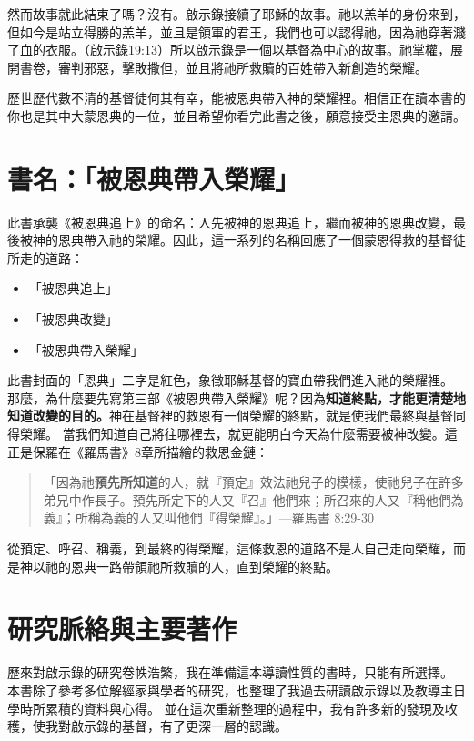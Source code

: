 然而故事就此結束了嗎？沒有。啟示錄接續了耶穌的故事。祂以羔羊的身份來到，但如今是站立得勝的羔羊，並且是領軍的君王，我們也可以認得祂，因為祂穿著濺了血的衣服。（啟示錄19:13）所以啟示錄是一個以基督為中心的故事。祂掌權，展開書卷，審判邪惡，擊敗撒但，並且將祂所救贖的百姓帶入新創造的榮耀。

歷世歷代數不清的基督徒何其有幸，能被恩典帶入神的榮耀裡。相信正在讀本書的你也是其中大蒙恩典的一位，並且希望你看完此書之後，願意接受主恩典的邀請。

\section*{書名：「被恩典帶入榮耀」}

此書承襲《被恩典追上》的命名：人先被神的恩典追上，繼而被神的恩典改變，最後被神的恩典帶入祂的榮耀。因此，這一系列的名稱回應了一個蒙恩得救的基督徒所走的道路：
\begin{itemize}
\item 「被恩典追上」
\item 「被恩典改變」
\item 「被恩典帶入榮耀」
\end{itemize}
此書封面的「恩典」二字是紅色，象徵耶穌基督的寶血帶我們進入祂的榮耀裡。
那麼，為什麼要先寫第三部《被恩典帶入榮耀》呢？因為\textbf{知道終點，才能更清楚地知道改變的目的。}神在基督裡的救恩有一個榮耀的終點，就是使我們最終與基督同得榮耀。
當我們知道自己將往哪裡去，就更能明白今天為什麼需要被神改變。這正是保羅在《羅馬書》8章所描繪的救恩金鏈：

\begin{quote}
「因為祂\textbf{預先所知道}的人，就『預定』效法祂兒子的模樣，使祂兒子在許多弟兄中作長子。預先所定下的人又『召』他們來；所召來的人又『稱他們為義』；所稱為義的人又叫他們『得榮耀』。」—羅馬書 8:29-30
\end{quote}
從預定、呼召、稱義，到最終的得榮耀，這條救恩的道路不是人自己走向榮耀，而是神以祂的恩典一路帶領祂所救贖的人，直到榮耀的終點。

\section*{研究脈絡與主要著作}

歷來對啟示錄的研究卷帙浩繁，我在準備這本導讀性質的書時，只能有所選擇。
本書除了參考多位解經家與學者的研究，也整理了我過去研讀啟示錄以及教導主日學時所累積的資料與心得。
並在這次重新整理的過程中，我有許多新的發現及收穫，使我對啟示錄的基督，有了更深一層的認識。

